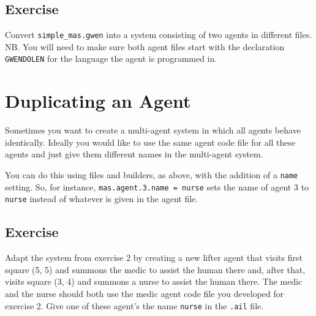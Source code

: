 \subsection{Exercise}
Convert \texttt{simple\_mas.gwen} into a system consisting of two agents in different files.  NB.  You will need to make sure both agent files start with the declaration \texttt{GWENDOLEN} for the language the agent is programmed in.

\section{Duplicating an Agent}

Sometimes you want to create a multi-agent system in which all agents behave identically.  Ideally you would like to use the same agent code file for all these agents and just give them different names in the multi-agent system.

You can do this using files and builders, as above, with the addition of a \texttt{name} setting.  So, for instance, \texttt{mas.agent.3.name = nurse} sets the name of agent 3 to \texttt{nurse} instead of whatever is given in the agent file.

\subsection{Exercise}
Adapt the system from exercise 2 by creating a new lifter agent that visits first square (5, 5) and summons the medic to assist the human there and, after that, visits square (3, 4) and summons a nurse to assist the human there.  The medic and the nurse should both use the medic agent code file you developed for exercise 2.  Give one of these agent's the name \texttt{nurse} in the \texttt{.ail} file.

